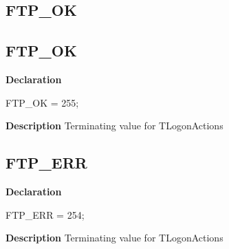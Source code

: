 \documentclass{report}
\newif\ifpdf
\begin{document}
\subsection*{\large{\textbf{FTP{\_}OK}}\normalsize\hspace{1ex}\hrulefill}
\else
\subsection*{FTP{\_}OK}
\fi
\label{ftpsend-FTP_OK}
\begin{list}{}{
\setlength{\itemindent}{0cm}
\setlength{\listparindent}{0cm}
\setlength{\leftmargin}{\evensidemargin}
\addtolength{\leftmargin}{\tmplength}
\settowidth{\labelsep}{X}
\addtolength{\leftmargin}{\labelsep}
\setlength{\labelwidth}{\tmplength}
}
\item[\textbf{Declaration}\hfill]
\ifpdf
\begin{flushleft}
\fi
\begin{ttfamily}
FTP{\_}OK = 255;\end{ttfamily}

\ifpdf
\end{flushleft}
\fi

\par
\item[\textbf{Description}]
Terminating value for TLogonActions

\end{list}
\ifpdf
\subsection*{\large{\textbf{FTP{\_}ERR}}\normalsize\hspace{1ex}\hrulefill}
\else
\subsection*{FTP{\_}ERR}
\fi
\label{ftpsend-FTP_ERR}
\begin{list}{}{
\setlength{\itemindent}{0cm}
\setlength{\listparindent}{0cm}
\setlength{\leftmargin}{\evensidemargin}
\addtolength{\leftmargin}{\tmplength}
\settowidth{\labelsep}{X}
\addtolength{\leftmargin}{\labelsep}
\setlength{\labelwidth}{\tmplength}
}
\item[\textbf{Declaration}\hfill]
\ifpdf
\begin{flushleft}
\fi
\begin{ttfamily}
FTP{\_}ERR = 254;\end{ttfamily}

\ifpdf
\end{flushleft}
\fi

\par
\item[\textbf{Description}]
Terminating value for TLogonActions

\end{list}
\end{document}

